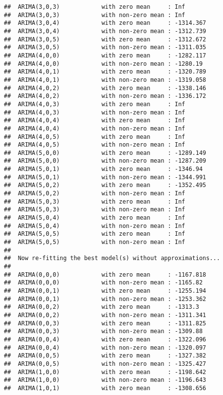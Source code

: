 \documentclass[]{article}
\begin{document}
\begin{verbatim}
##  ARIMA(3,0,3)            with zero mean     : Inf
##  ARIMA(3,0,3)            with non-zero mean : Inf
##  ARIMA(3,0,4)            with zero mean     : -1314.367
##  ARIMA(3,0,4)            with non-zero mean : -1312.739
##  ARIMA(3,0,5)            with zero mean     : -1312.672
##  ARIMA(3,0,5)            with non-zero mean : -1311.035
##  ARIMA(4,0,0)            with zero mean     : -1282.117
##  ARIMA(4,0,0)            with non-zero mean : -1280.19
##  ARIMA(4,0,1)            with zero mean     : -1320.789
##  ARIMA(4,0,1)            with non-zero mean : -1319.058
##  ARIMA(4,0,2)            with zero mean     : -1338.146
##  ARIMA(4,0,2)            with non-zero mean : -1336.172
##  ARIMA(4,0,3)            with zero mean     : Inf
##  ARIMA(4,0,3)            with non-zero mean : Inf
##  ARIMA(4,0,4)            with zero mean     : Inf
##  ARIMA(4,0,4)            with non-zero mean : Inf
##  ARIMA(4,0,5)            with zero mean     : Inf
##  ARIMA(4,0,5)            with non-zero mean : Inf
##  ARIMA(5,0,0)            with zero mean     : -1289.149
##  ARIMA(5,0,0)            with non-zero mean : -1287.209
##  ARIMA(5,0,1)            with zero mean     : -1346.94
##  ARIMA(5,0,1)            with non-zero mean : -1344.991
##  ARIMA(5,0,2)            with zero mean     : -1352.495
##  ARIMA(5,0,2)            with non-zero mean : Inf
##  ARIMA(5,0,3)            with zero mean     : Inf
##  ARIMA(5,0,3)            with non-zero mean : Inf
##  ARIMA(5,0,4)            with zero mean     : Inf
##  ARIMA(5,0,4)            with non-zero mean : Inf
##  ARIMA(5,0,5)            with zero mean     : Inf
##  ARIMA(5,0,5)            with non-zero mean : Inf
## 
##  Now re-fitting the best model(s) without approximations...
## 
##  ARIMA(0,0,0)            with zero mean     : -1167.818
##  ARIMA(0,0,0)            with non-zero mean : -1165.82
##  ARIMA(0,0,1)            with zero mean     : -1255.194
##  ARIMA(0,0,1)            with non-zero mean : -1253.362
##  ARIMA(0,0,2)            with zero mean     : -1313.3
##  ARIMA(0,0,2)            with non-zero mean : -1311.341
##  ARIMA(0,0,3)            with zero mean     : -1311.825
##  ARIMA(0,0,3)            with non-zero mean : -1309.88
##  ARIMA(0,0,4)            with zero mean     : -1322.096
##  ARIMA(0,0,4)            with non-zero mean : -1320.097
##  ARIMA(0,0,5)            with zero mean     : -1327.382
##  ARIMA(0,0,5)            with non-zero mean : -1325.427
##  ARIMA(1,0,0)            with zero mean     : -1198.642
##  ARIMA(1,0,0)            with non-zero mean : -1196.643
##  ARIMA(1,0,1)            with zero mean     : -1308.656

\end{verbatim}
\end{document}
